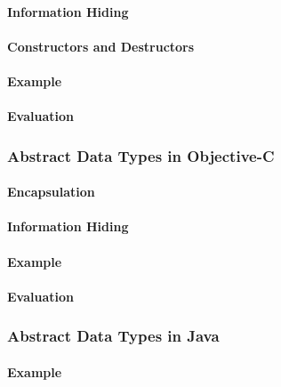 \paragraph{Information Hiding}\label{par:C++_Info_Hiding}
\paragraph{Constructors and Destructors}\label{par:C++_Constructors_Destructors}
\paragraph{Example}\label{par:C++_Abstract_Data_Type_Example}
\paragraph{Evaluation}\label{par:C++_Abstract_Data_Type_Evaluation}

\subsubsection{Abstract Data Types in Objective-C}\label{subsubsec:Abstract_Data_Types_Objective_C}
\paragraph{Encapsulation}\label{par:Objective_C_Encapsulation}
\paragraph{Information Hiding}\label{par:Objective_C_Info_Hiding}
\paragraph{Example}\label{par:Objective_C_Abstract_Data_Type_Example}
\paragraph{Evaluation}\label{par:Objective_C_Abstract_Data_Type_Evaluation}

\subsubsection{Abstract Data Types in Java}\label{subsubsec:Abstract_Data_Types_Java}
\paragraph{Example}\label{par:Java_Abstract_Data_Type_Example}
